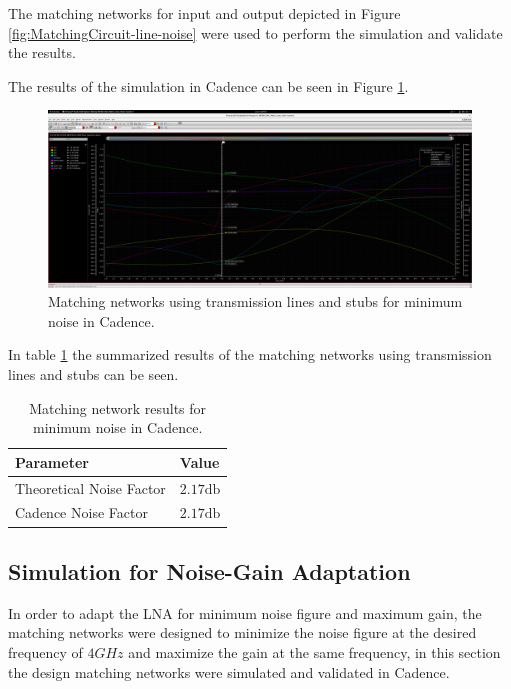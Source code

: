 The matching networks for input and output depicted in Figure \ref{fig:MatchingCircuit-line-noise} were used to perform the simulation and validate the results.

The results of the simulation in Cadence can be seen in Figure \ref{fig:CadenceNoiseMatchingCircuitLine}.
\begin{figure}[H]
    \centering
    \includegraphics[width=1\textwidth]{Images/CAD-LinesmatchNoise.png}
    \caption{Matching networks using transmission lines and stubs for minimum noise in Cadence.}
    \label{fig:CadenceNoiseMatchingCircuitLine}
\end{figure}

In table \ref{tab:NoiseMatchingParameters} the summarized results of the matching networks using transmission lines and stubs can be seen.
\begin{table}[H]
    \centering
    \caption{Matching network results for minimum noise in Cadence.}
    \begin{tabularx}{\textwidth}{>{\centering\arraybackslash}X >{\centering\arraybackslash}X}
        \toprule
        \textbf{Parameter} & \textbf{Value} \\
        \midrule
        Theoretical Noise Factor  & $2.17 \si{\decibel}$ \\
        \midrule
        Cadence Noise Factor & $2.17 \si{\decibel}$ \\
        \bottomrule
    \end{tabularx}
    \label{tab:NoiseMatchingParameters}
\end{table}

\subsection{Simulation for Noise-Gain Adaptation}

In order to adapt the LNA for minimum noise figure and maximum gain, the matching networks were designed to minimize the noise figure at the desired frequency of $4 GHz$ and maximize the gain at the same frequency, in this section the design matching networks were simulated and validated in Cadence.

